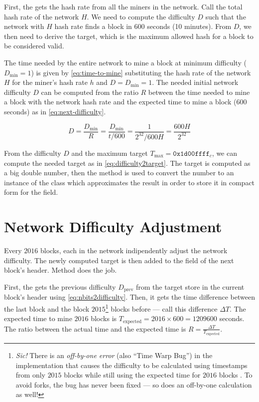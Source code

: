 First, the  gets the hash rate from all the miners in the network.
Call the total hash rate of the network \(H\). We need to compute the
difficulty \(D\) such that the network with \(H\) hash rate finds a block in
\(600\) seconds (10 minutes). From \(D\), we then need to derive the target,
which is the maximum allowed hash for a block to be considered valid.

The time needed by the entire network to mine a block at minimum difficulty
(\(D_{\text{min}} = 1\)) is given by \eqref{eq:time-to-mine} substituting the
hash rate of the network \(H\) for the miner's hash rate \(h\) and \(D =
D_{\text{min}} = 1\). The needed initial network difficulty \(D\) can be
computed from the ratio \(R\) between the time needed to mine a block with the
network hash rate and the expected time to mine a block (\(600\) seconds) as in
\eqref{eq:next-difficulty}.

\begin{equation}\label{eq:next-difficulty}
	D = \frac{D_{\text{min}}}{R} = \frac{D_{\text{min}}}{t/600} =
	\frac{1}{2^{32}/600H} = \frac{600 H}{2^{32}}
\end{equation}

From the difficulty \(D\) and the maximum target \(T_{\text{max}} =
\texttt{0x1d00ffff}_{c}\), we can compute the needed target as in
\eqref{eq:difficulty2target}. The target is computed as a big double number,
then the  method is used to convert the number to
an instance of the  class which approximates the result in order to
store it in compact form for the  field.

\section{Network Difficulty Adjustment}\label{appendix:difficulty-adjustment}

Every \(2016\) blocks, each  in the network
indipendently adjust the network difficulty. The newly computed target is then
added to the  field of the next block's header. Method
 does the job.

First, the  gets the previous difficulty
\(D_{\text{prev}}\) from the target store in the current block's header using
\eqref{eq:nbits2difficulty}. Then, it gets the time difference between the last
block and the block \(2015\)\footnote{\emph{Sic!} There is an \emph{off-by-one
error} (also ``Time Warp Bug'')
in the  implementation that causes the difficulty to be
calculated using timestamps from only \(2015\) blocks while still using the
expected time for \(2016\) blocks \cite{bitcoin-core}. To avoid forks, the bug
has never been fixed --- so \iblock{} does an off-by-one calculation as well!}
blocks before --- call this difference \(\Delta T\). The expected time to mine
\(2016\) blocks is \(T_{\text{expected}} = 2016 \times 600 = 1209600\) seconds.
The ratio between the actual time and the expected time is \(R = \frac{\Delta
T}{T_{\text{expected}}}\).

